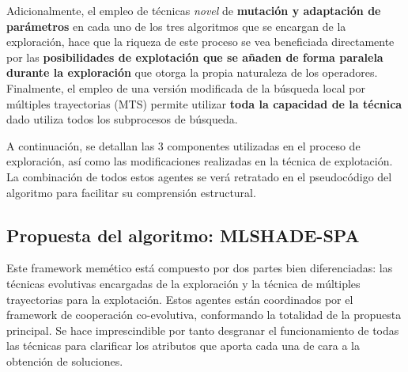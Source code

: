 Adicionalmente, el empleo de técnicas \textit{novel} de \textbf{mutación y adaptación de parámetros} en cada uno de los tres algoritmos que se encargan de la exploración, hace que la riqueza de este proceso se vea beneficiada directamente por las \textbf{posibilidades de explotación que se añaden de forma paralela durante la exploración} que otorga la propia naturaleza de los operadores. Finalmente, el empleo de una versión modificada de la búsqueda local por múltiples trayectorias (MTS) permite utilizar \textbf{toda la capacidad de la técnica} dado utiliza todos los subprocesos de búsqueda.

A continuación, se detallan las 3 componentes utilizadas en el proceso de exploración, así como las modificaciones realizadas en la técnica de explotación. La combinación de todos estos agentes se verá retratado en el pseudocódigo del algoritmo para facilitar su comprensión estructural.

\subsection{Propuesta del algoritmo: MLSHADE-SPA}

Este framework memético está compuesto por dos partes bien diferenciadas: las técnicas evolutivas encargadas de la exploración y la técnica de múltiples trayectorias para la explotación. Estos agentes están coordinados por el framework de cooperación co-evolutiva, conformando la totalidad de la propuesta principal. Se hace imprescindible por tanto desgranar el funcionamiento de todas las técnicas para clarificar los atributos que aporta cada una de cara a la obtención de soluciones.

